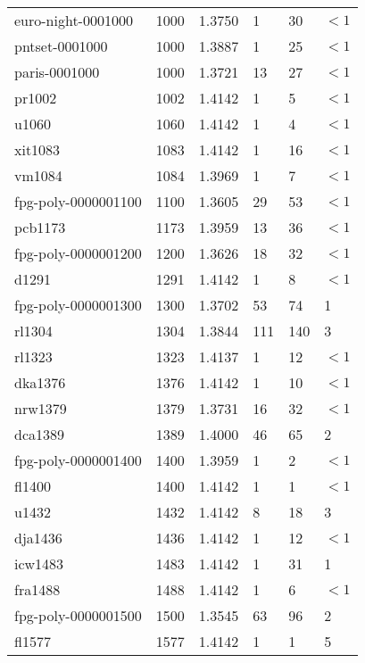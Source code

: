 \begin{longtable}{|lrrlll|}
euro-night-0001000 & 1000 & \num{1.3750} & \num{1} & \num{30} & $<1$ \\
pntset-0001000 & 1000 & \num{1.3887} & \num{1} & \num{25} & $<1$ \\
paris-0001000 & 1000 & \num{1.3721} & \num{13} & \num{27} & $<1$ \\
pr1002 & 1002 & \num{1.4142} & \num{1} & \num{5} & $<1$ \\
u1060 & 1060 & \num{1.4142} & \num{1} & \num{4} & $<1$ \\
xit1083 & 1083 & \num{1.4142} & \num{1} & \num{16} & $<1$ \\
vm1084 & 1084 & \num{1.3969} & \num{1} & \num{7} & $<1$ \\
fpg-poly-0000001100 & 1100 & \num{1.3605} & \num{29} & \num{53} & $<1$ \\
pcb1173 & 1173 & \num{1.3959} & \num{13} & \num{36} & $<1$ \\
fpg-poly-0000001200 & 1200 & \num{1.3626} & \num{18} & \num{32} & $<1$ \\
d1291 & 1291 & \num{1.4142} & \num{1} & \num{8} & $<1$ \\
fpg-poly-0000001300 & 1300 & \num{1.3702} & \num{53} & \num{74} & \num{1} \\
rl1304 & 1304 & \num{1.3844} & \num{111} & \num{140} & \num{3} \\
rl1323 & 1323 & \num{1.4137} & \num{1} & \num{12} & $<1$ \\
dka1376 & 1376 & \num{1.4142} & \num{1} & \num{10} & $<1$ \\
nrw1379 & 1379 & \num{1.3731} & \num{16} & \num{32} & $<1$ \\
dca1389 & 1389 & \num{1.4000} & \num{46} & \num{65} & \num{2} \\
fpg-poly-0000001400 & 1400 & \num{1.3959} & \num{1} & \num{2} & $<1$ \\
fl1400 & 1400 & \num{1.4142} & \num{1} & \num{1} & $<1$ \\
u1432 & 1432 & \num{1.4142} & \num{8} & \num{18} & \num{3} \\
dja1436 & 1436 & \num{1.4142} & \num{1} & \num{12} & $<1$ \\
icw1483 & 1483 & \num{1.4142} & \num{1} & \num{31} & \num{1} \\
fra1488 & 1488 & \num{1.4142} & \num{1} & \num{6} & $<1$ \\
fpg-poly-0000001500 & 1500 & \num{1.3545} & \num{63} & \num{96} & \num{2} \\
fl1577 & 1577 & \num{1.4142} & \num{1} & \num{1} & \num{5} \\

\end{longtable}

